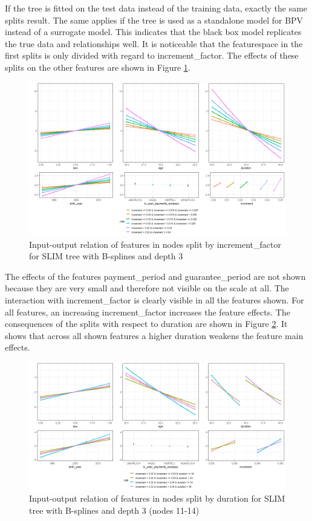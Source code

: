 If the tree is fitted on the test data instead of the training data, exactly the same splits result. The same applies if the tree is used as a standalone model for BPV instead of a surrogate model. This indicates that the black box model replicates the true data and relationships well.
It is noticeable that the featurespace in the first splits is only divided with regard to increment\_factor. The effects of these splits on the other features are shown in Figure \ref{fig:ins_k108_effects_increment}.

\begin{figure}[!htb]
    \centering    
    \includegraphics[width=16cm]{Figures/insurance_use_case/k1_08_BPV/effects_increment_factor.png}
    \caption{Input-output relation of features in nodes split by increment\_factor for SLIM tree with B-splines and depth 3}
    \label{fig:ins_k108_effects_increment}
\end{figure}

The effects of the features payment\_period and guarantee\_period are not shown because they are very small and therefore not visible on the scale at all.
The interaction with increment\_factor is clearly visible in all the features shown. For all features, an increasing increment\_factor increases the feature effects.
The consequences of the splits with respect to duration are shown in Figure \ref{fig:ins_k108_effects_duration}. It shows that across all shown features a higher duration weakens the feature main effects.

\begin{figure}[!htb]
    \centering 
    \includegraphics[width=16cm]{Figures/insurance_use_case/k1_08_BPV/effects_duration.png}
    \caption{Input-output relation of features in nodes split by duration for SLIM tree with B-splines and depth 3 (nodes 11-14)}
    \label{fig:ins_k108_effects_duration}
\end{figure}


